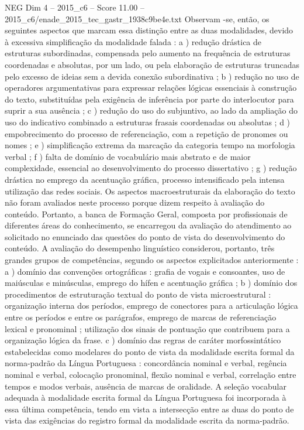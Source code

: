 \begin{textsample}{NEG Dim 4 – 2015\_c6 – Score 11.00 – 2015\_c6/enade\_2015\_tec\_gastr\_1938c9be4e.txt}
Observam -se, então, os seguintes aspectos que marcam essa distinção entre as duas modalidades, devido à excessiva simplificação da modalidade falada : a ) redução drástica de estruturas subordinadas, compensada pelo aumento na frequência de estruturas coordenadas e absolutas, por um lado, ou pela elaboração de estruturas truncadas pelo excesso de ideias sem a devida conexão subordinativa ; b ) redução no uso de operadores argumentativas para expressar relações lógicas essenciais à construção do texto, substituídas pela exigência de inferência por parte do interlocutor para suprir a sua ausência ; c ) redução do uso do subjuntivo, ao lado da ampliação do uso do indicativo combinado a estruturas frasais coordenadas ou absolutas ; d ) empobrecimento do processo de referenciação, com a repetição de pronomes ou nomes ; e ) simplificação extrema da marcação da categoria tempo na morfologia verbal ; f ) falta de domínio de vocabulário mais abstrato e de maior complexidade, essencial ao desenvolvimento do processo dissertativo ; g ) redução drástica no emprego da acentuação gráfica, processo intensificado pela intensa utilização das redes sociais.
Os aspectos macroestruturais da elaboração do texto não foram avaliados neste processo porque dizem respeito à avaliação do conteúdo.
Portanto, a banca de Formação Geral, composta por profissionais de diferentes áreas do conhecimento, se encarregou da avaliação do atendimento ao solicitado no enunciado das questões do ponto de vista do desenvolvimento do conteúdo.
A avaliação do desempenho linguístico considerou, portanto, três grandes grupos de competências, segundo os aspectos explicitados anteriormente : a ) domínio das convenções ortográficas : grafia de vogais e consoantes, uso de maiúsculas e minúsculas, emprego do hífen e acentuação gráfica ; b ) domínio dos procedimentos de estruturação textual do ponto de vista microestrutural : organização interna dos períodos, emprego de conectores para a articulação lógica entre os períodos e entre os parágrafos, emprego de marcas de referenciação lexical e pronominal ; utilização dos sinais de pontuação que contribuem para a organização lógica da frase. c ) domínio das regras de caráter morfossintático estabelecidas como modelares do ponto de vista da modalidade escrita formal da norma-padrão da Língua Portuguesa : concordância nominal e verbal, regência nominal e verbal, colocação pronominal, flexão nominal e verbal, correlação entre tempos e modos verbais, ausência de marcas de oralidade.
A seleção vocabular adequada à modalidade escrita formal da Língua Portuguesa foi incorporada à essa última competência, tendo em vista a intersecção entre as duas do ponto de vista das exigências do registro formal da modalidade escrita da norma-padrão.

\end{textsample}

